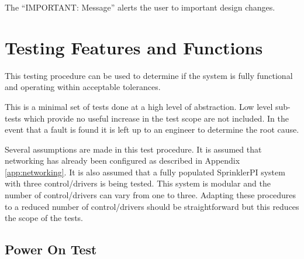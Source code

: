 \documentclass{article}
\begin{document}
The ``IMPORTANT: Message'' alerts the user to important design changes.


\section{Testing Features and Functions}

This testing procedure can be used to determine if the system
is fully functional and operating within acceptable tolerances.

This is a minimal set of tests done at a high level of abstraction.
Low level sub-tests which provide no useful increase in the test scope
are not included.
In the event that a fault is found it is left up to an engineer to
determine the root cause.

Several assumptions are made in this test procedure.
It is assumed that networking has already been configured as
described in Appendix \ref{app:networking}.
It is also assumed that a fully populated SprinklerPI system with
three control/drivers is being tested.
This system is modular and the number of control/drivers can vary
from one to three.
Adapting these procedures to a reduced number of control/drivers should
be straightforward but this reduces the scope of the tests.

\subsection{Power On Test}
\end{document}
